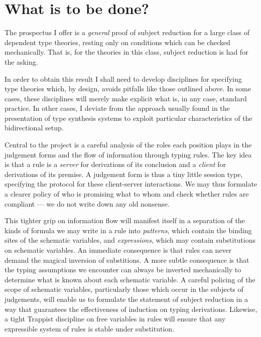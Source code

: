 \documentclass{jfp1}
\begin{document}
\section{What is to be done?}

The prospectus I offer is a \emph{general} proof of subject reduction for a
large class of dependent type theories, resting only on conditions which can
be checked mechanically. That is, for the theories in this class, subject
reduction is had for the asking.

In order to obtain this result I shall need to develop disciplines for
specifying type theories which, by design, avoids pitfalls like those
outlined above.  In some cases, these disciplines will merely make
explicit what is, in any case, standard practice. In other cases, I
deviate from the approach usually found in the presentation of type
synthesis systems to exploit particular characteristics of the
bidirectional setup.

Central to the project is a careful analysis of the roles each position
plays in the judgement forms and the flow of information through typing rules.
The key idea is that a rule is a \emph{server} for derivations of its conclusion
and a \emph{client} for derivations of its premise. A judgement form is thus a
tiny little session type, specifying the protocol for these client-server
interactions. We may thus formulate a clearer policy of who is promising
what to whom and check whether rules are compliant --- we do not write down
any old nonsense.

This tighter grip on information flow will manifest itself in a separation
of the kinds of formula we may write in a rule into \emph{patterns}, which contain
the binding sites of the schematic variables, and \emph{expressions}, which may
contain substitutions on schematic variables. An immediate consequence is
that rules can never demand the magical inversion of substitions. A more subtle
consequence is that the typing assumptions we encounter can always be inverted
mechanically to determine what is known about each schematic variable. A careful
policing of the scope of schematic variables, particularly
those which occur in the subjects of judgements, will enable us to formulate
the statement of subject reduction in a way that guarantees the effectiveness
of induction on typing derivations. Likewise, a tight Trappist discipline on
free variables in rules will ensure that any expressible system of rules is stable under
substitution.
\end{document}
